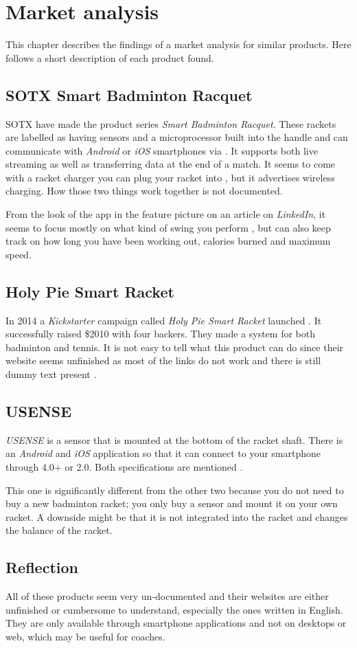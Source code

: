 \section{Market analysis}
This chapter describes the findings of a market analysis for similar products. 
Here follows a short description of each product found.

\subsection*{SOTX Smart Badminton Racquet}
SOTX have made the product series \textit{Smart Badminton Racquet}. 
These rackets are labelled as having sensors and a microprocessor built into the handle and can communicate with \textit{Android} or \textit{iOS} smartphones via   \citep{marketAnalysis:sotxsite}. 
It supports both live streaming as well as transferring data at the end of a match. 
It seems to come with a racket charger you can plug your racket into \citep{marketAnalysis:sotxhw}, but it advertises wireless charging. 
How those two things work together is not documented.

From the look of the app in the feature picture on an article on \textit{LinkedIn}, it seems to focus mostly on what kind of swing you perform \citep{marketAnalysis:sotxapp}, but can also keep track on how long you have been working out, calories burned and maximum speed.

\subsection*{Holy Pie Smart Racket}
In 2014 a \textit{Kickstarter} campaign called \textit{Holy Pie Smart Racket} launched \citep{marketAnalysis:holypie}. 
It successfully raised \$2010 with four backers. 
They made a system for both badminton and tennis. 
It is not easy to tell what this product can do since their website seems unfinished as most of the links do not work and there is still dummy text present \citep{marketAnalysis:holypi}.

\subsection*{USENSE}
\textit{USENSE} is a sensor that is mounted at the bottom of the racket shaft. 
There is an \textit{Android} and \textit{iOS} application so that it can connect to your smartphone through  4.0+ or 2.0. 
Both specifications are mentioned \citep{marketAnalysis:usense}.
 
This one is significantly different from the other two because you do not need to buy a new badminton racket; you only buy a sensor and mount it on your own racket. 
A downside might be that it is not integrated into the racket and changes the balance of the racket.

\subsection*{Reflection}
All of these products seem very un-documented and their websites are either unfinished or cumbersome to understand, especially the ones written in English. 
They are only available through smartphone applications and not on desktops or web, which may be useful for coaches.
